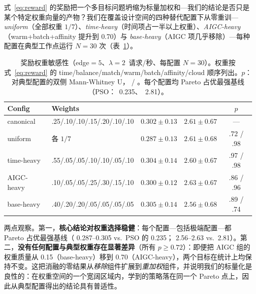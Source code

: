 式~\ref{eq:reward} 的奖励把一个多目标问题坍缩为标量加权和---我们的结论是否只是某个特定权重向量的产物？我们在覆盖设计空间的四种替代配置下从零重训---\emph{uniform}（全部权重 $1/7$）、\emph{time-heavy}（时间项占一半以上权重）、\emph{AIGC-heavy}（warm{+}batch{+}affinity 提升到 0.70）与 \emph{base-heavy}（AIGC 项几乎移除）---每种配置在典型工作点运行 $N{=}30$ 次（表~\ref{tab:weight-sens}）。

\begin{table}[t]
  \centering
  \caption{奖励权重敏感性（edge${=}5$、$\lambda{=}2$~请求/秒、每配置 $N{=}30$）。权重按式~\ref{eq:reward} 的 time/balance/match/warm/batch/affinity/cloud 顺序列出。$p$：对典型配置的双侧 Mann-Whitney U，\slo{} / \etok。每个配置均 Pareto 占优最强基线（PSO：\slo{}~0.235、\etok{}~2.81）。}
  \label{tab:weight-sens}
  \scriptsize
  \setlength{\tabcolsep}{2.5pt}
  \begin{tabular}{@{}llccc@{}}
    \toprule
    Config & Weights & \slo{} & \etok{} & $p$ \\
    \midrule
    canonical & .25/.10/.10/.15/.20/.10/.10
      & $0.302 {\pm} 0.13$ & $2.61 {\pm} 0.67$ & --- \\
    uniform & 各 $1/7$
      & $0.287 {\pm} 0.13$ & $2.61 {\pm} 0.68$ & .72 / .98 \\
    time-heavy & .55/.05/.05/.10/.10/.05/.10
      & $0.304 {\pm} 0.14$ & $2.60 {\pm} 0.67$ & .97 / .98 \\
    AIGC-heavy & .10/.05/.05/.25/.30/.15/.10
      & $0.300 {\pm} 0.12$ & $2.63 {\pm} 0.67$ & .86 / .96 \\
    base-heavy & .40/.20/.20/.05/.05/.05/.05
      & $0.305 {\pm} 0.14$ & $2.56 {\pm} 0.68$ & .89 / .74 \\
    \bottomrule
  \end{tabular}
\end{table}

两点观察。第一，\textbf{核心结论对权重选择稳健}：每个配置---包括极端配置---都 Pareto 占优最强基线（\slo{} 0.287--0.305 vs.\ PSO 的 0.235；\etok{} 2.56--2.63 vs.\ 2.81）。第二，\textbf{没有任何配置与典型权重存在显著差异}（所有 $p \ge 0.72$）：即便把 AIGC 组的权重质量从 0.15（base-heavy）移到 0.70（AIGC-heavy），两个目标在统计上均保持不变。这把消融的零结果从\emph{移除}组件扩展到\emph{重加权}组件，并说明我们的标量化是良性的：在权重空间的一个宽阔区域内，学到的策略落在同一个 Pareto 点上，因此从典型配置得出的结论具有普适性。
